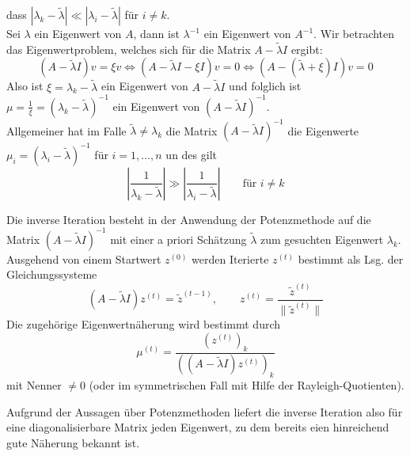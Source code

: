 \documentclass{article}
\begin{document}
    dass $|\lambda_k-\tilde{\lambda}|\ll |\lambda_i-\tilde{\lambda}|$ für $i\neq k$.\\
    Sei $\lambda$ ein Eigenwert von $A$, dann ist $\lambda^{-1}$ ein Eigenwert von $A^{-1}$. 
    Wir betrachten das Eigenwertproblem, welches sich für die Matrix $A-\tilde{\lambda}I$ ergibt:
    \[(A-\tilde{\lambda}I)v=\xi v \iff (A-\tilde{\lambda}I-\xi I)v = 0 \iff (A-(\tilde{\lambda}+\xi)I)v=0\]
    Also ist $\xi=\lambda_k-\tilde{\lambda}$ ein Eigenwert von $A-\tilde{\lambda}I$ und folglich ist 
    $\mu=\tfrac{1}{\xi}=(\lambda_k-\tilde{\lambda})^{-1}$ ein Eigenwert von $(A-\tilde{\lambda}I)^{-1}$. \\
    Allgemeiner hat im Falle $\tilde{\lambda}\neq\lambda_k$ die Matrix $(A-\tilde{\lambda}I)^{-1}$ die Eigenwerte 
    $\mu_i = (\lambda_i-\tilde{\lambda})^{-1}$ für $i=1,\dotsc,n$ un des gilt 
    \[\left|\dfrac{1}{\lambda_k-\tilde{\lambda}}\right| \gg \left|\dfrac{1}{\lambda_i-\tilde{\lambda}}\right|\qquad 
    \text{für } i\neq k\]
    \newpage
    \begin{defbox}
        Die inverse Iteration besteht in der Anwendung der Potenzmethode auf die Matrix $(A-\tilde{\lambda}I)^{-1}$
        mit einer a priori Schätzung $\tilde{\lambda}$ zum gesuchten Eigenwert $\lambda_k$. \\ 
        Ausgehend von einem Startwert $z^{(0)}$ werden Iterierte $z^{(t)}$ bestimmt als Lsg. der Gleichungssysteme
        \[(A-\tilde{\lambda}I)z^{(t)} = \tilde{z}^{(t-1)},
        \qquad z^{(t)} = \dfrac{\tilde{z}^{(t)}}{\|\tilde{z}^{(t)}\|}\]
        Die zugehörige Eigenwertnäherung wird bestimmt durch 
        \[\mu^{(t)}=\dfrac{(z^{(t)})_k}{((A-\tilde{\lambda}I)z^{(t)})_k}\]
        mit Nenner $\neq 0$ (oder im symmetrischen Fall mit Hilfe der Rayleigh-Quotienten).
    \end{defbox}
    Aufgrund der Aussagen über Potenzmethoden liefert die inverse Iteration also für eine diagonalisierbare Matrix
    jeden Eigenwert, zu dem bereits eien hinreichend gute Näherung bekannt ist.
\end{document}
